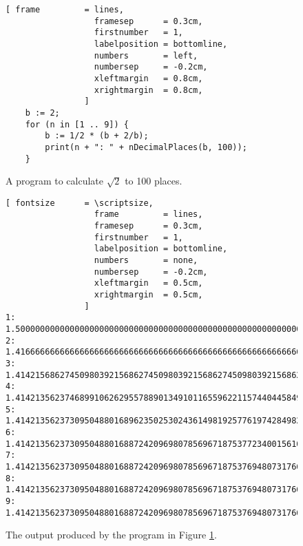 \begin{figure}[!ht]
\centering
\begin{Verbatim}[ frame         = lines, 
                  framesep      = 0.3cm, 
                  firstnumber   = 1,
                  labelposition = bottomline,
                  numbers       = left,
                  numbersep     = -0.2cm,
                  xleftmargin   = 0.8cm,
                  xrightmargin  = 0.8cm,
                ]
    b := 2;
    for (n in [1 .. 9]) {
        b := 1/2 * (b + 2/b);
        print(n + ": " + nDecimalPlaces(b, 100));
    }
\end{Verbatim}
\vspace*{-0.3cm}
\caption{A program to calculate $\sqrt{2}$ to 100 places.}
\label{fig:sqrt.stlx}
\end{figure}


\begin{figure}[!ht]
\centering
\begin{Verbatim}[ fontsize      = \scriptsize,
                  frame         = lines, 
                  framesep      = 0.3cm, 
                  firstnumber   = 1,
                  labelposition = bottomline,
                  numbers       = none,
                  numbersep     = -0.2cm,
                  xleftmargin   = 0.5cm,
                  xrightmargin  = 0.5cm,
                ]
1: 1.5000000000000000000000000000000000000000000000000000000000000000000000000000000000000000000000000000
2: 1.4166666666666666666666666666666666666666666666666666666666666666666666666666666666666666666666666666
3: 1.4142156862745098039215686274509803921568627450980392156862745098039215686274509803921568627450980392
4: 1.4142135623746899106262955788901349101165596221157440445849050192000543718353892683589900431576443402
5: 1.4142135623730950488016896235025302436149819257761974284982894986231958242289236217849418367358303565
6: 1.4142135623730950488016887242096980785696718753772340015610131331132652556303399785317871612507104752
7: 1.4142135623730950488016887242096980785696718753769480731766797379907324784621070388503875343276416016
8: 1.4142135623730950488016887242096980785696718753769480731766797379907324784621070388503875343276415727
9: 1.4142135623730950488016887242096980785696718753769480731766797379907324784621070388503875343276415727
\end{Verbatim}
\vspace*{-0.3cm}
\caption{The output produced by the program in Figure \ref{fig:sqrt.stlx}.}
\label{fig:sqrt-output}
\end{figure}

